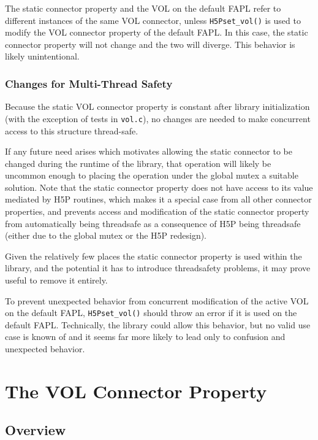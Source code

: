 \documentclass{article}
\begin{document}
The static connector property and the VOL on the default FAPL refer to different instances of the same VOL connector, unless \texttt{H5Pset\_vol()} is used to modify the VOL connector property of the default FAPL. In this case, the static connector property will not change and the two will diverge. This behavior is likely unintentional.

\subsubsection{Changes for Multi-Thread Safety}

Because the static VOL connector property is constant after library initialization (with the exception of tests in \texttt{vol.c}), no changes are needed to make concurrent access to this structure thread-safe. 

If any future need arises which motivates allowing the static connector to be changed during the runtime of the library, that operation will likely be uncommon enough to placing the operation under the global mutex a suitable solution. Note that the static connector property does not have access to its value mediated by H5P routines, which makes it a special case from all other connector properties, and prevents access and modification of the static connector property from automatically being threadsafe as a consequence of H5P being threadsafe (either due to the global mutex or the H5P redesign). 

Given the relatively few places the static connector property is used within the library, and the potential it has to introduce threadsafety problems, it may prove useful to remove it entirely.

To prevent unexpected behavior from concurrent modification of the active VOL on the default FAPL, \texttt{H5Pset\_vol()} should throw an error if it is used on the default FAPL. Technically, the library could allow this behavior, but no valid use case is known of and it seems far more likely to lead only to confusion and unexpected behavior.

\section{The VOL Connector Property}

\subsection{Overview}
\end{document}
